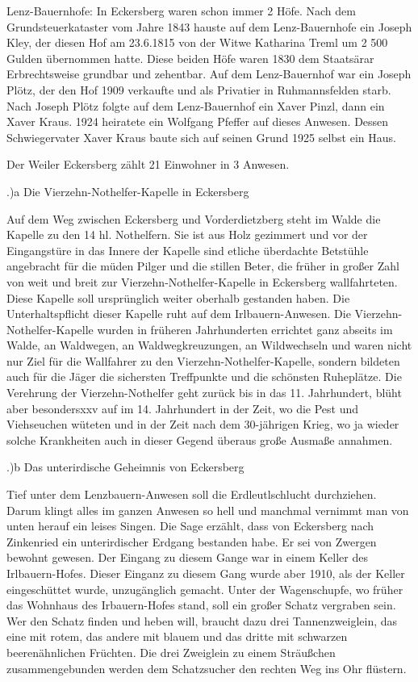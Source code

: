 Lenz-Bauernhofe: In Eckersberg waren schon immer 2 Höfe. Nach dem
Grundsteuerkataster vom Jahre 1843 hauste auf dem Lenz-Bauernhofe ein Joseph
Kley, der diesen Hof am 23.6.1815 von der Witwe Katharina Treml um 2 500 Gulden
übernommen hatte. Diese beiden Höfe waren 1830 dem Staatsärar Erbrechtsweise
grundbar und zehentbar. Auf dem Lenz-Bauernhof war ein Joseph Plötz, der den Hof
1909 verkaufte und als Privatier in Ruhmannsfelden starb. Nach Joseph Plötz
folgte auf dem Lenz-Bauernhof ein Xaver Pinzl, dann ein Xaver Kraus. 1924
heiratete ein Wolfgang Pfeffer auf dieses Anwesen. Dessen Schwiegervater Xaver
Kraus baute sich auf seinen Grund 1925 selbst ein Haus.

Der Weiler Eckersberg zählt 21 Einwohner in 3 Anwesen.

.)a Die Vierzehn-Nothelfer-Kapelle in Eckersberg

Auf dem Weg zwischen Eckersberg und Vorderdietzberg steht im Walde die Kapelle
zu den 14 hl. Nothelfern. Sie ist aus Holz gezimmert und vor der Eingangstüre in
das Innere der Kapelle sind etliche überdachte Betstühle angebracht für die
müden Pilger und die stillen Beter, die früher in großer Zahl von weit und breit
zur Vierzehn-Nothelfer-Kapelle in Eckersberg wallfahrteten. Diese Kapelle soll
ursprünglich weiter oberhalb gestanden haben. Die Unterhaltspflicht dieser
Kapelle ruht auf dem Irlbauern-Anwesen. Die Vierzehn-Nothelfer-Kapelle wurden in
früheren Jahrhunderten errichtet ganz abseits im Walde, an Waldwegen, an
Waldwegkreuzungen, an Wildwechseln und waren nicht nur Ziel für die Wallfahrer
zu den Vierzehn-Nothelfer-Kapelle, sondern bildeten auch für die Jäger die
sichersten Treffpunkte und die schönsten Ruheplätze. Die Verehrung der
Vierzehn-Nothelfer geht zurück bis in das 11. Jahrhundert, blüht aber
besondersxxv auf im 14. Jahrhundert in der Zeit, wo die Pest und Viehseuchen
wüteten und in der Zeit nach dem 30-jährigen Krieg, wo ja wieder solche
Krankheiten auch in dieser Gegend überaus große Ausmaße annahmen.

.)b Das unterirdische Geheimnis von Eckersberg

Tief unter dem Lenzbauern-Anwesen soll die Erdleutlschlucht durchziehen. Darum
klingt alles im ganzen Anwesen so hell und manchmal vernimmt man von unten
herauf ein leises Singen. Die Sage erzählt, dass von Eckersberg nach Zinkenried
ein unterirdischer Erdgang bestanden habe. Er sei von Zwergen bewohnt gewesen.
Der Eingang zu diesem Gange war in einem Keller des Irlbauern-Hofes. Dieser
Einganz zu diesem Gang wurde aber 1910, als der Keller eingeschüttet wurde,
unzugänglich gemacht. Unter der Wagenschupfe, wo früher das Wohnhaus des
Irbauern-Hofes stand, soll ein großer Schatz vergraben sein. Wer den Schatz
finden und heben will, braucht dazu drei Tannenzweiglein, das eine mit rotem,
das andere mit blauem und das dritte mit schwarzen beerenähnlichen Früchten. Die
drei Zweiglein zu einem Sträußchen zusammengebunden werden dem Schatzsucher den
rechten Weg ins Ohr flüstern.

